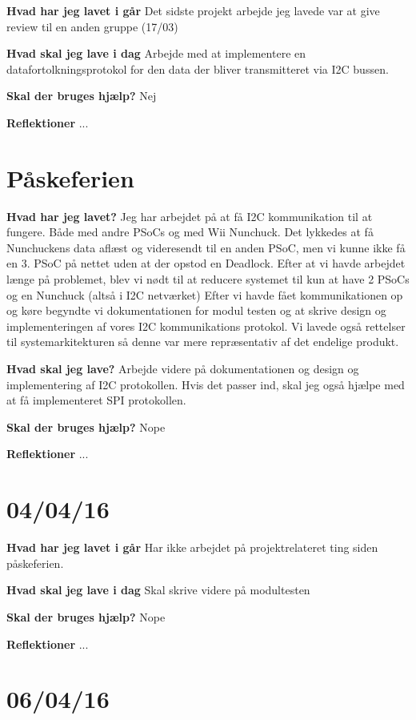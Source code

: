 \documentclass{article}
\begin{document}
	\textbf{Hvad har jeg lavet i går}
	Det sidste projekt arbejde jeg lavede var at give review til en anden gruppe (17/03)
	
	\textbf{Hvad skal jeg lave i dag}
	Arbejde med at implementere en datafortolkningsprotokol for den data der bliver transmitteret via I2C bussen.
	
	\textbf{Skal der bruges hjælp?}
	Nej
	
	\textbf{Reflektioner}
	...
	
	\section{Påskeferien}
	
	\textbf{Hvad har jeg lavet?}
	Jeg har arbejdet på at få I2C kommunikation til at fungere. Både med andre PSoCs og med Wii Nunchuck. Det lykkedes at få Nunchuckens data aflæst og videresendt til en anden PSoC, men vi kunne ikke få en  3. PSoC på nettet uden at der opstod en Deadlock. Efter at vi havde arbejdet længe på problemet, blev vi nødt til at reducere systemet til kun at have 2 PSoCs og en Nunchuck (altså i I2C netværket) Efter vi havde fået kommunikationen op og køre begyndte vi dokumentationen for modul testen og at skrive design og implementeringen af vores I2C kommunikations protokol. Vi lavede også rettelser til systemarkitekturen så denne var mere repræsentativ af det endelige produkt.
	
	\textbf{Hvad skal jeg lave?}
	Arbejde videre på dokumentationen og design og implementering af I2C protokollen. Hvis det passer ind, skal jeg også hjælpe med at få implementeret SPI protokollen.
	
	\textbf{Skal der bruges hjælp?}
	Nope
	
	\textbf{Reflektioner}
	...
	
	\section{04/04/16}
	
	\textbf{Hvad har jeg lavet i går}
	Har ikke arbejdet på projektrelateret ting siden påskeferien.
	
	\textbf{Hvad skal jeg lave i dag}
	Skal skrive videre på modultesten
	
	\textbf{Skal der bruges hjælp?}
	Nope
	
	\textbf{Reflektioner}
	...
	
	\section{06/04/16}
	
\end{document}

